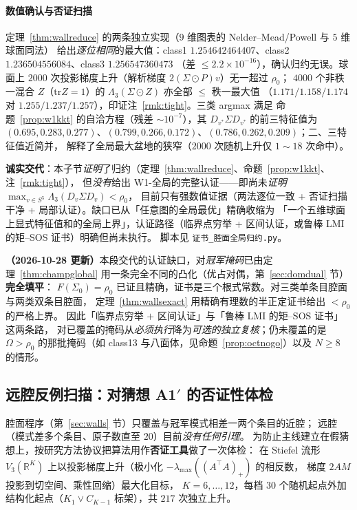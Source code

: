 \documentclass[UTF8,11pt]{ctexart}
\theoremstyle{definition}
\newcommand{\Lam}{\Lambda}
\newcommand{\R}{\mathbb{R}}
\begin{document}
\paragraph{数值确认与否证扫描}
定理~\ref{thm:wallreduce} 的两条独立实现（$9$ 维图表的 Nelder--Mead/Powell 与 $5$ 维球面同法）
给出\emph{逐位相同}的最大值：class1 $1.254642464407$、class2 $1.236504556084$、class3 $1.256547360473$
（差 $\le2.2\times10^{-16}$），确认归约无误。球面上 $2000$ 次投影梯度上升（解析梯度 $2(\Sigma\odot P)v$）无一超过 $\rho_0$；
$4000$ 个非秩一混合 $Z$（$\mathrm{tr}Z=1$）的 $\Lam_3(\Sigma\odot Z)$ 亦全部 $\le$ 秩一最大值
（$1.171/1.158/1.174$ 对 $1.255/1.237/1.257$），印证注~\ref{rmk:tight}。三类 argmax 满足
命题~\ref{prop:w1kkt} 的自洽方程（残差 $\sim10^{-7}$），其 $D_{v^*}\Sigma D_{v^*}$ 的前三特征值为
$(0.695,0.283,0.277)$、$(0.799,0.266,0.172)$、$(0.786,0.262,0.209)$；二、三特征值近简并，
解释了全局最大盆地的狭窄（$2000$ 次随机上升仅 $1\sim18$ 次命中）。

\textbf{诚实交代}：本子节\emph{证明}了归约（定理~\ref{thm:wallreduce}、命题~\ref{prop:w1kkt}、注~\ref{rmk:tight}），
但\emph{没有}给出 W1-全局的完整认证——即尚未\emph{证明} $\max_{v\in S^5}\Lam_3(D_v\Sigma D_v)<\rho_0$，
目前只有强数值证据（两法逐位一致 + 否证扫描干净 + 局部认证）。缺口已从「任意图的全局最优」精确收缩为
「一个五维球面上显式特征值和的全局上界」，认证路径（临界点穷举 + 区间认证，或鲁棒 LMI 的矩--SOS 证书）明确但尚未执行。
脚本见 \texttt{证书\_腔面全局归约.py}。

\textbf{（2026-10-28 更新）}本段交代的认证缺口，对\emph{冠军掩码}已由定理~\ref{thm:champglobal}
用一条完全不同的凸化（优占对偶，第~\ref{sec:domdual} 节）\textbf{完全填平}：
$F(\Sigma_0)=\rho_0$ 已证且精确，证书是三个根式常数。对三类单条目腔面与两类双条目腔面，
定理~\ref{thm:wallsexact} 用精确有理数的半正定证书给出 $<\rho_0$ 的严格上界。
因此「临界点穷举 $+$ 区间认证」与「鲁棒 LMI 的矩--SOS 证书」这两条路，
对已覆盖的掩码从\emph{必须执行}降为\emph{可选的独立复核}；仍未覆盖的是
$\Omega>\rho_0$ 的那批掩码（如 class13 与八面体，见命题~\ref{prop:octnogo}）以及 $N\ge8$ 的情形。

\subsection{远腔反例扫描：对猜想 A1$'$ 的否证性体检}\label{sec:scan}

腔面程序（第~\ref{sec:walls} 节）只覆盖与冠军模式相差一两个条目的近腔；
远腔（模式差多个条目、原子数直至 $20$）目前\emph{没有任何引理}。
为防止主线建立在假猜想上，按研究方法协议把算法用作\textbf{否证工具}做了一次体检：
在 Stiefel 流形 $V_3(\R^K)$ 上以投影梯度上升（极小化 $-\lambda_{\max}((A^\top A)_+)$ 的相反数，
梯度 $2AM$ 投影到切空间、乘性回缩）最大化目标，
$K=6,\dots,12$，每档 $30$ 个随机起点外加结构化起点（$K_1\vee C_{K-1}$ 标架），共 $217$ 次独立上升。
\end{document}
